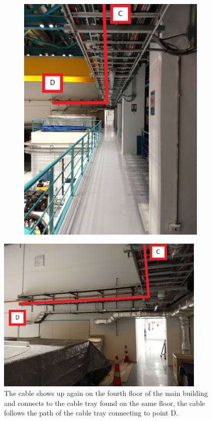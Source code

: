 \begin{figure}
\begin{subfigure}{0.45\textwidth}
      \includegraphics[width=\textwidth]{images/15.jpg}
    \end{subfigure}
  \end{figure}
  \begin{figure}
    \centering
    \includegraphics[width=10cm]{images/16.jpg}
    \caption*{The cable shows up again on the fourth floor of the main building and connects to the cable tray found on the same floor, the cable follows the path of the cable tray connecting to point D.}
  \end{figure}

